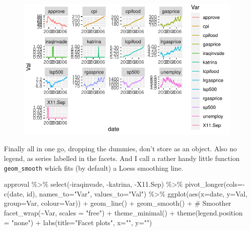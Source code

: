 \documentclass[
  letterpaper,
]{book}
\newenvironment{Shaded}{\begin{snugshade}}{\end{snugshade}}
\newcommand{\AttributeTok}[1]{\textcolor[rgb]{0.40,0.45,0.13}{#1}}
\newcommand{\CommentTok}[1]{\textcolor[rgb]{0.37,0.37,0.37}{#1}}
\newcommand{\FunctionTok}[1]{\textcolor[rgb]{0.28,0.35,0.67}{#1}}
\newcommand{\NormalTok}[1]{\textcolor[rgb]{0.00,0.23,0.31}{#1}}
\newcommand{\SpecialCharTok}[1]{\textcolor[rgb]{0.37,0.37,0.37}{#1}}
\newcommand{\StringTok}[1]{\textcolor[rgb]{0.13,0.47,0.30}{#1}}
\begin{document}
\begin{figure}[H]

{\centering \includegraphics{Appendix1_files/figure-pdf/unnamed-chunk-10-1.pdf}

}

\end{figure}

Finally all in one go, dropping the dummies, don't store as an object.
Also no legend, as series labelled in the facets. And I call a rather
handy little function \texttt{geom\_smooth} which fits (by default) a
Loess smoothing line.

\begin{Shaded}
\begin{Highlighting}[]
\NormalTok{approval }\SpecialCharTok{\%\textgreater{}\%} 
  \FunctionTok{select}\NormalTok{(}\SpecialCharTok{{-}}\NormalTok{iraqinvade, }\SpecialCharTok{{-}}\NormalTok{katrina, }\SpecialCharTok{{-}}\NormalTok{X11.Sep) }\SpecialCharTok{\%\textgreater{}\%}
  \FunctionTok{pivot\_longer}\NormalTok{(}\AttributeTok{cols=}\SpecialCharTok{{-}}\FunctionTok{c}\NormalTok{(date, id), }\AttributeTok{names\_to=}\StringTok{"Var"}\NormalTok{, }\AttributeTok{values\_to=}\StringTok{"Val"}\NormalTok{) }\SpecialCharTok{\%\textgreater{}\%}
  \FunctionTok{ggplot}\NormalTok{(}\FunctionTok{aes}\NormalTok{(}\AttributeTok{x=}\NormalTok{date, }\AttributeTok{y=}\NormalTok{Val, }\AttributeTok{group=}\NormalTok{Var, }\AttributeTok{colour=}\NormalTok{Var)) }\SpecialCharTok{+}
  \FunctionTok{geom\_line}\NormalTok{() }\SpecialCharTok{+}
  \FunctionTok{geom\_smooth}\NormalTok{() }\SpecialCharTok{+} \CommentTok{\# Smoother}
  \FunctionTok{facet\_wrap}\NormalTok{(}\SpecialCharTok{\textasciitilde{}}\NormalTok{Var, }\AttributeTok{scales =} \StringTok{"free"}\NormalTok{) }\SpecialCharTok{+}
  \FunctionTok{theme\_minimal}\NormalTok{() }\SpecialCharTok{+} 
  \FunctionTok{theme}\NormalTok{(}\AttributeTok{legend.position =} \StringTok{"none"}\NormalTok{) }\SpecialCharTok{+}
  \FunctionTok{labs}\NormalTok{(}\AttributeTok{title=}\StringTok{"Facet plots"}\NormalTok{, }\AttributeTok{x=}\StringTok{""}\NormalTok{, }\AttributeTok{y=}\StringTok{""}\NormalTok{)}
\end{Highlighting}
\end{Shaded}
\end{document}
